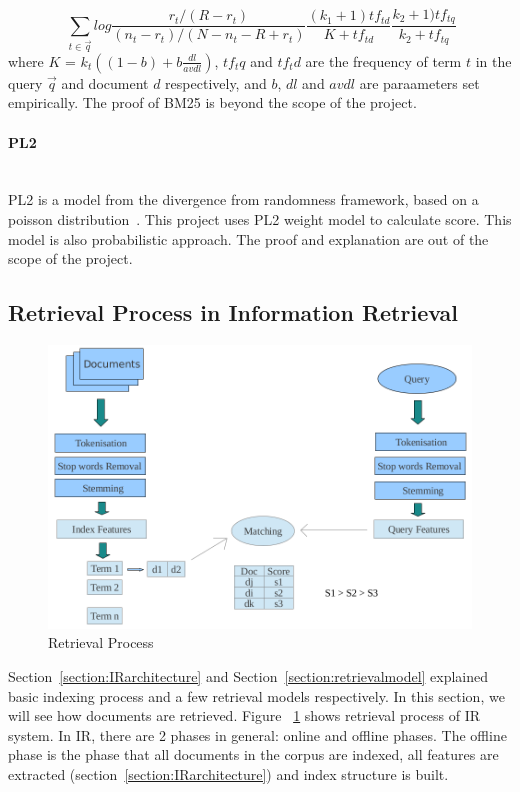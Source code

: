 \begin{equation}~\label{eq:BM25}
\sum_{t \in \vec{q}} log \frac{r_t/(R - r_t)}{(n_t - r_t)/(N - n_t - R + r_t)} \frac{(k_1 + 1)tf_{td}}{K + tf_{td}} \frac{k_2 + 1)tf_{tq}}{k_2 + tf_{tq}}
\end{equation}
where $K$ = $k_t((1 - b) + b\frac{dl}{avdl})$, $tf_tq$ and $tf_td$ are the frequency of term $t$ in the query $\vec{q}$ and document $d$ respectively,
and $b$, $dl$ and $avdl$ are paraameters set empirically. The proof of BM25 is beyond the scope of the project.

\paragraph{PL2} \hspace{0pt} \\
PL2 is a model from the divergence from randomness framework, based on a poisson distribution~\cite{craig}. This project uses PL2 weight model to 
calculate score. This model is also probabilistic approach. The proof and explanation are out of the scope of the project.


\subsection{Retrieval Process in Information Retrieval}\label{section:retrieving}
\begin{figure}
\centering
\includegraphics[scale=0.3]{./figures/retrieval.png}
\caption{Retrieval Process} \label{fig:retrieval} 
\end{figure}
Section~\ref{section:IRarchitecture} and Section~\ref{section:retrievalmodel} explained basic indexing process and a few retrieval models respectively.
In this section, we will see how documents are retrieved. Figure ~\ref{fig:retrieval} shows
retrieval process of IR system. In IR, there are 2 phases in general:
online and offline phases. The offline phase is the phase that all documents in the corpus are indexed, all features are extracted 
(section~\ref{section:IRarchitecture}) and index structure is built. 

